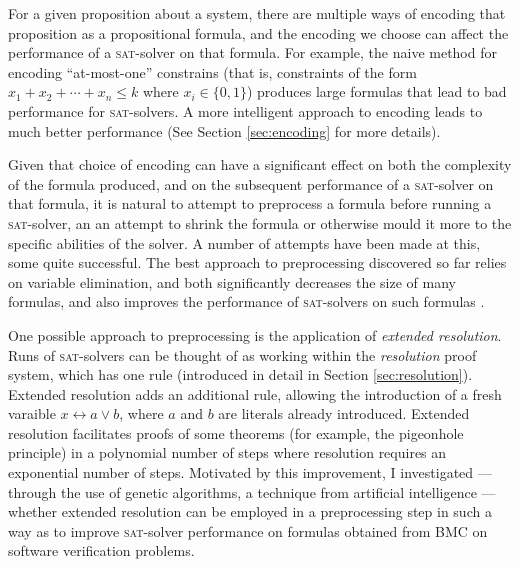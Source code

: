 \documentclass[proof,pdftex,11pt,a4,titlepage]{article}
\newcommand{\sat}{\textsc{sat}}
\begin{document}
For a given proposition about a system, there are multiple ways of encoding that proposition as a propositional formula, and the encoding we choose can affect the performance of a \sat{}-solver on that formula. For example, the naive method for encoding ``at-most-one'' constrains (that is, constraints of the form $x_1 + x_2+ \cdots + x_n \leq k$ where $x_i \in \{0,1\}$) produces large formulas that lead to bad performance for \sat{}-solvers. A more intelligent approach to encoding leads to much better performance (See Section \ref{sec:encoding} for more details).

Given that choice of encoding can have a significant effect on both the complexity of the formula produced, and on the subsequent performance of a \sat{}-solver on that formula, it is natural to attempt to preprocess a formula before running a \sat{}-solver, an an attempt to shrink the formula or otherwise mould it more to the specific abilities of the solver. A number of attempts have been made at this, some quite successful. The best approach to preprocessing discovered so far relies on variable elimination, and both significantly decreases the size of many formulas, and also improves the performance of \sat{}-solvers on such formulas \cite{Een:2005}.

One possible approach to preprocessing is the application of \emph{extended resolution}. Runs of \sat{}-solvers can be thought of as working within the \emph{resolution} proof system, which has one rule (introduced in detail in Section \ref{sec:resolution}). Extended resolution adds an additional rule, allowing the introduction of a fresh varaible $x \leftrightarrow a \vee b$, where $a$ and $b$ are literals already introduced. Extended resolution facilitates proofs of some theorems (for example, the pigeonhole principle) in a polynomial number of steps where resolution requires an exponential number of steps. Motivated by this improvement, I investigated --- through the use of genetic algorithms, a technique from artificial intelligence --- whether extended resolution can be employed in a preprocessing step in such a way as to improve \sat{}-solver performance on formulas obtained from BMC on software verification problems.
\end{document}
